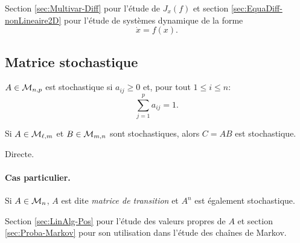 \remark Section \ref{sec:Multivar-Diff} pour l'étude de $J_x(f)$ et section \ref{sec:EquaDiff-nonLineaire2D} pour l'étude de systèmes dynamique de la forme
$$
\dot{x} = f(x).
$$

\subsection{Matrice stochastique}  \label{sec:MatStoch}

\begin{definition}
  $A \in \mathcal{M}_{n, p}$ est stochastique si $a_{ij} \geq 0$ et, pour tout $1 \leq i \leq n$:
  $$
  \sum_{j=1}^p a_{ij} = 1.
  $$
\end{definition}

\begin{proposition}
  Si $A \in \mathcal{M}_{\ell, m}$ et $B \in \mathcal{M}_{m, n}$ sont stochastiques, alors $C = A B$ est stochastique.
\end{proposition}

\proof Directe. \eproof

\paragraph*{Cas particulier.} Si $A \in \mathcal{M}_n$, $A$ est dite \emph{matrice de transition} et $A^n$ est également stochastique.

\remark Section \ref{sec:LinAlg-Pos} pour l'étude des valeurs propres de $A$ et section \ref{sec:Proba-Markov} pour son utilisation dans l'étude des chaînes de Markov.
